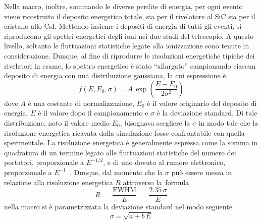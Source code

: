 Nella macro, inoltre, sommando le diverse perdite di energia, per ogni evento viene ricostruito il deposito energetico totale, sia per il rivelatore al SiC sia per il cristallo allo CsI.
Mettendo insieme i depositi di energia di tutti gli eventi, si riproducono gli spettri energetici degli ioni nei due stadi del telescopio.
A questo livello, soltanto le fluttuazioni statistiche legate alla ionizzazione sono tenute in considerazione.
Dunque, al fine di riprodurre le risoluzioni energetiche tipiche dei rivelatori in esame, lo spettro energetico è stato ``allargato'' campionando ciascun deposito di energia con una distribuzione gaussiana, la cui espressione è
\begin{equation}
	f(E, E_0, \sigma) = A \, \exp \left( \frac{E - E_0}{2 {\sigma}^2} \right)
\end{equation}
dove $A$ è una costante di normalizzazione, $E_0$ è il valore originario del deposito di energia, $E$ è il valore dopo il campionamento e $\sigma$ è la deviazione standard.
Di tale distribuzione, noto il valore medio $E_0$, bisognava scegliere la $\sigma$ in modo tale che la risoluzione energetica ricavata dalla simulazione fosse confrontabile con quella sperimentale.
La risoluzione energetica è generalmente espressa come la somma in quadratura di un termine legato alle fluttuazioni statistiche del numero dei portatori, proporzionale a $E^{-1/2}$, e di uno dovuto al rumore elettronico, proporzionale a $E^{-1}$~\cite{knoll:10}.
Dunque, dal momento che la $\sigma$ può essere messa in relazione alla risoluzione energetica $R$ attraverso la~formula
\begin{equation}
	R \,  = \, \frac{\mbox{FWHM}}{E} \, = \, \frac{2.35 \, \sigma}{E}
\end{equation}
nella macro si è parametrizzata la deviazione standard nel modo seguente
\begin{equation}
\sigma = \sqrt{a + b \, E}
\end{equation}
